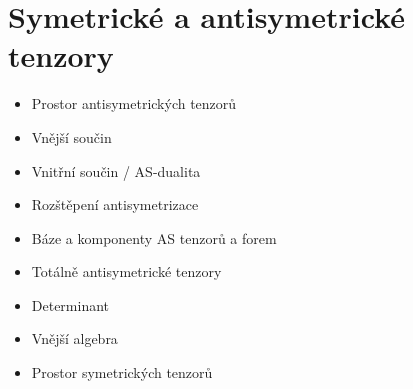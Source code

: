 \providecommand{\gmIsedmAbox}[3]{%
\begin{tikzpicture}[baseline=(current bounding box.center),x=0.16cm,y=0.16cm,line width=0.5pt]
  \draw (0,-1.6) rectangle (4,0.4); \node[font=\scriptsize] at (2,-0.6) {$#1$};
  \foreach \e [count=\i] in {#2} \draw (\i,0.4) -- (\e,2.6);
  \ifnum#3=1 \draw[line width=1.1pt] (0.5,2.6) -- (3.5,2.6); \fi
  \ifnum#3=2 \draw[decorate,decoration={snake,amplitude=0.4pt,segment length=2pt}] (0.5,2.6) -- (3.5,2.6); \fi
  \ifnum#3=3 \draw[decorate,decoration={snake,amplitude=0.4pt,segment length=2pt}] (0.5,2.6) -- (2.5,2.6); \fi
  \ifnum#3=4 \draw[line width=1.1pt] (1.5,2.6) -- (3.5,2.6); \fi
  \ifnum#3=5 \draw[decorate,decoration={snake,amplitude=0.4pt,segment length=2pt}] (0.5,1.6) -- (2.5,1.6);
             \draw[line width=1.1pt] (1.5,2.6) -- (3.5,2.6); \fi
\end{tikzpicture}}
\providecommand{\gmIsedmAbar}[1]{%
\begin{tikzpicture}[baseline=(current bounding box.center),x=0.16cm,y=0.16cm,line width=0.5pt]
  \foreach \i in {1,2,4} {\draw (\i,-1.4) -- (\i,1.4);}
  \node[font=\tiny] at (3,0.9) {$\cdots$};
  \draw[line width=1.1pt] (0.5,0) -- (4.5,0);
  \draw[decorate,decoration={brace,mirror,amplitude=2pt}] (0.5,-1.8) -- (4.5,-1.8) node[midway,below=1pt,font=\tiny] {$#1$};
\end{tikzpicture}}

\section{Symetrické a antisymetrické tenzory}

\begin{itemize}[nosep]
  \item Prostor antisymetrických tenzorů
  \item Vnější součin
  \item Vnitřní součin / AS-dualita
  \item Rozštěpení antisymetrizace
  \item Báze a komponenty AS tenzorů a forem
  \item Totálně antisymetrické tenzory
  \item Determinant
  \item Vnější algebra
  \item Prostor symetrických tenzorů
\end{itemize}

